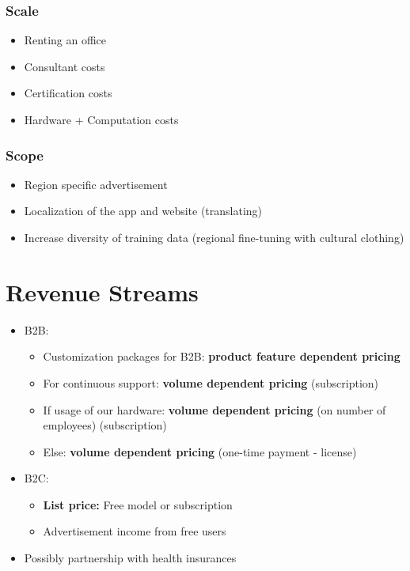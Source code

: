 \subsubsection*{Scale}
\begin{itemize}
    \item Renting an office
    \item Consultant costs
    \item Certification costs
    \item Hardware + Computation costs
\end{itemize}

\subsubsection*{Scope}
\begin{itemize}
    \item Region specific advertisement
    \item Localization of the app and website (translating)
    \item Increase diversity of training data (regional fine-tuning with cultural clothing)
\end{itemize}

\section{Revenue Streams}
\begin{itemize}
    \item B2B:
        \begin{itemize}
            \item Customization packages for B2B: \textbf{product feature dependent pricing}
            \item For continuous support:  \textbf{volume dependent pricing} (subscription)
            \item If usage of our hardware: \textbf{volume dependent pricing} (on number of employees) (subscription)
            \item Else: \textbf{volume dependent pricing} (one-time payment - license)
        \end{itemize}
    \item B2C:
        \begin{itemize}
            \item \textbf{List price:} Free model or subscription
            \item Advertisement income from free users
        \end{itemize}
    \item Possibly partnership with health insurances
\end{itemize}